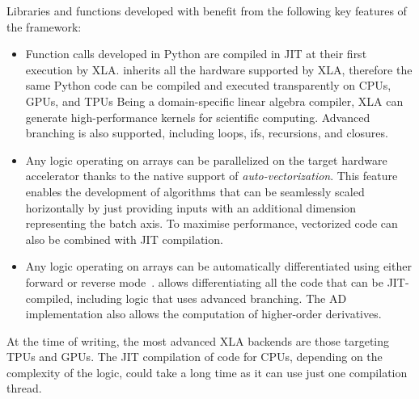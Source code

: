 Libraries and functions developed with \jax benefit from the following key features of the framework:
%
\begin{itemize}
%
\item
Function calls developed in Python are compiled in \ac{JIT} at their first execution by \ac{XLA}.
\jax inherits all the hardware supported by \ac{XLA}, therefore the same Python code can be compiled and executed transparently on \acp{CPU}, \acp{GPU}, and \acp{TPU}
Being a domain-specific linear algebra compiler, \ac{XLA} can generate high-performance kernels for scientific computing.
Advanced branching is also supported, including loops, ifs, recursions, and closures.

\item
Any logic operating on \jax arrays can be parallelized on the target hardware accelerator thanks to the native support of \emph{auto-vectorization}.
This feature enables the development of algorithms that can be seamlessly scaled horizontally by just providing inputs with an additional dimension representing the batch axis.
To maximise performance, vectorized code can also be combined with \ac{JIT} compilation.

\item
Any logic operating on \jax arrays can be automatically differentiated using either forward or reverse mode~\parencite{blondel_efficient_2022}.
\jax allows differentiating all the code that can be \ac{JIT}-compiled, including logic that uses advanced branching.
The \ac{AD} implementation also allows the computation of higher-order derivatives.
%
\end{itemize}

\noindent
At the time of writing, the most advanced \ac{XLA} backends are those targeting \acp{TPU} and \acp{GPU}.
The \ac{JIT} compilation of code for \acp{CPU}, depending on the complexity of the logic, could take a long time as it can use just one compilation thread.
